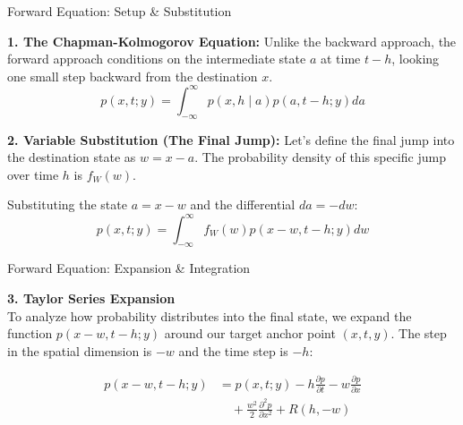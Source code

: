 \documentclass{beamer}
\begin{document}
\begin{frame}{Forward Equation: Setup \& Substitution}

\textbf{1. The Chapman-Kolmogorov Equation:}
Unlike the backward approach, the forward approach conditions on the intermediate state $a$ at time $t - h$, looking one small step backward from the destination $x$. %
$$p(x,t;y) = \int_{-\infty}^\infty p(x,h \mid a)p(a,t-h;y)da$$ 



\textbf{2. Variable Substitution (The Final Jump):}
Let's define the final jump into the destination state as $w = x - a$. The probability density of this specific jump over time $h$ is $f_W(w)$.

Substituting the state $a = x - w$ and the differential $da = -dw$:
$$p(x,t;y) = \int_{-\infty}^\infty f_W(w)p(x-w,t-h;y)dw$$

\end{frame}

\begin{frame}{Forward Equation: Expansion \& Integration}

\textbf{3. Taylor Series Expansion} \\
To analyze how probability distributes into the final state, we expand the function $p(x-w, t-h; y)$ around our target anchor point $(x, t, y)$. The step in the spatial dimension is $-w$ and the time step is $-h$: %

\begin{align*}
p(x-w, t-h; y) &= p(x, t; y) - h\frac{\partial p}{\partial t} - w\frac{\partial p}{\partial x} \\
&\quad + \frac{w^2}{2}\frac{\partial^2 p}{\partial x^2} + R(h, -w)
\end{align*} %


\end{frame}
\end{document}
